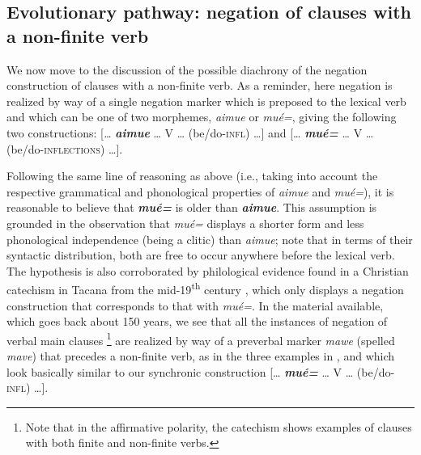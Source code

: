 \documentclass[output=paper]{langsci/langscibook}
\begin{document}
\subsection{Evolutionary pathway: negation of clauses with a non-finite
verb}\label{sec:tacana-10.2}

We now move to the discussion of the possible diachrony of the negation construction of clauses with a non-finite verb. As a reminder, here negation is realized by way of a single negation marker which is preposed to the lexical verb and which can be one of two morphemes, \textit{aimue} or \textit{mué=}, giving the following two constructions: [\textit{…} \textbf{\textit{aimue}} … V … (be/do-\textsc{infl}) …] and [… \textbf{\textit{mué=}} … V … (be/do-\textsc{inflections}) …].

Following the same line of reasoning as above (i.e., taking into account
the respective grammatical and phonological properties of \textit{aimue}
and \textit{mué=}), it is reasonable to believe that \textbf{\textit{mué=}}
is older than \textbf{\textit{aimue}}. This assumption is grounded in the
observation that \textit{mué=} displays a shorter form and less
phonological independence (being a clitic) than \textit{aimue}; note that
in terms of their syntactic distribution, both are free to occur anywhere
before the lexical verb. The hypothesis is also corroborated by
philological evidence found in a Christian catechism in Tacana from
the mid-19\textsuperscript{th} century \cite{LafoneQuevedo1902}, which only displays a negation construction that
corresponds to that with \textit{mué=}. In the material available, which
goes back about 150 years, we see that all the instances of negation
of verbal main clauses%
%
    \footnote{\label{fn:tacana-catechism} Note that in the affirmative polarity, the catechism shows
    examples of clauses with both finite and non-finite verbs.} 
%
are realized by way of a preverbal marker \textit{mawe} (spelled
\textit{mave}) that precedes a non-finite verb, as in the three examples in
, and which look basically similar to our synchronic construction [… \textbf{\textit{mué=}} … V … (be/do-\textsc{infl}) …].
\end{document}
